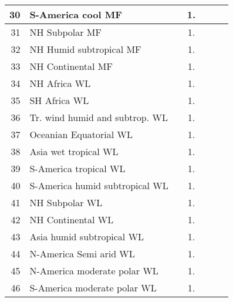 {{\begin{tabular}{||r|l||c|c|c|c|c||}
          30  & S-America cool MF                                            &       &  1.   &       &       \\
 \hline
          31  & NH Subpolar MF                                               &       &  1.   &       &       \\
 \hline
          32  & NH Humid subtropical MF                                      &       &  1.   &       &       \\
 \hline
          33  & NH Continental MF                                            &       &  1.   &       &       \\
 \hline
 \hline
          34  & NH Africa WL                                                 &       &  1.   &       &       \\
 \hline
          35  & SH Africa WL                                                 &       &  1.   &       &       \\
 \hline
          36  & Tr. wind humid and subtrop. WL                               &       &  1.   &       &       \\
 \hline
          37  & Oceanian Equatorial WL                                       &       &  1.   &       &       \\
 \hline
          38  & Asia wet tropical WL                                         &       &  1.   &       &       \\
 \hline
          39  & S-America tropical WL                                        &       &  1.   &       &       \\
 \hline
          40  & S-America humid subtropical WL                               &       &  1.   &       &       \\
 \hline
          41  & NH Subpolar WL                                               &       &  1.   &       &       \\
 \hline
          42  & NH Continental WL                                            &       &  1.   &       &       \\
 \hline
          43  & Asia humid subtropical WL                                    &       &  1.   &       &       \\
 \hline
          44  & N-America Semi arid WL                                       &       &  1.   &       &       \\
 \hline
          45  & N-America moderate polar WL                                  &       &  1.   &       &       \\
 \hline
          46  & S-America moderate polar WL                                  &       &  1.   &       &       \\

\end{tabular}}}

